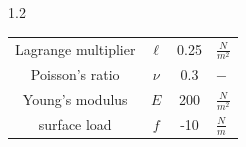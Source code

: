 \documentclass[preview]{standalone}
\begin{document}
\begin{spacing}{1.2}
\begin{tabular}{cccl}
\toprule
Lagrange multiplier & $\ell$ & 0.25 & $\frac{N}{m^2}$ \\ 
Poisson's ratio & $\nu$ & 0.3 & $-$ \\ 
Young's modulus & $E$ & 200 & $\frac{N}{m^2}$ \\ 
surface load & $f$ & -10 & $\frac{N}{m}$ \\ 
\bottomrule
\end{tabular}
\end{spacing}
\end{document}
